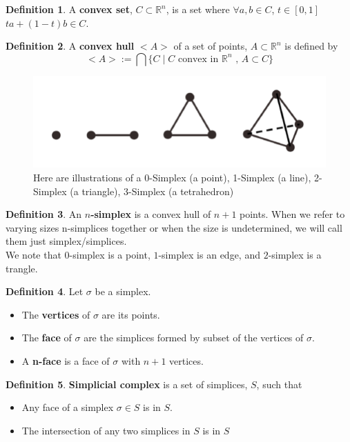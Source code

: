 \documentclass[12pt, a4paper, twocolumn, fullpage]{article}
\theoremstyle{plain}
\theoremstyle{definition}
\newtheorem{defn}{Definition}[section]
\theoremstyle{remark}
\begin{document}
\begin{defn}
A \textbf{convex set}, $C \subset \mathbb{R}^n$, is a set where $\forall a,b \in C$, $t \in [0,1]$ $ta+(1-t)b \in C$.
\end{defn}

\begin{defn}
A \textbf{convex hull} $<A>$ of a set of points, $A \subset \mathbb{R}^n$ is defined by 
$$<A> := \bigcap \{C \mid C \text{ convex in } \mathbb{R}^n \text{ , } A\subset C \} $$
\end{defn}

\begin{figure}[t]
    \includegraphics[width=\linewidth]{img/mathDef/simplex.png}
    \caption{Here are illustrations of a 0-Simplex (a point), 1-Simplex (a line), 2-Simplex (a triangle), 3-Simplex (a tetrahedron)}
    \label{Simplex}
\end{figure}

\begin{defn}
An \textbf{$n$-simplex} is a convex hull of $n+1$ points. When we refer to varying sizes n-simplices together or when the size is undetermined, we will call them just simplex/simplices.\\
We note that $0$-simplex is a point, $1$-simplex is an edge, and $2$-simplex is a trangle.
\end{defn}

\begin{defn}
Let $\sigma$ be a simplex.
\begin{itemize}
\item The \textbf{vertices} of $\sigma$ are its points.
\item The \textbf{face} of $\sigma$ are the simplices formed by subset of the vertices of $\sigma$.
\item A  \textbf{n-face} is a face of $\sigma$ with $n+1$ vertices.
\end{itemize}
\end{defn}

\begin{defn}
\textbf{Simplicial complex} is a set of simplices, $S $, such that 
\begin{itemize}
    \item Any face of a simplex $\sigma \in S$ is in $S$.
    \item The intersection of any two simplices in $ S $ is in $ S $
\end{itemize}
\end{defn}
\end{document}
